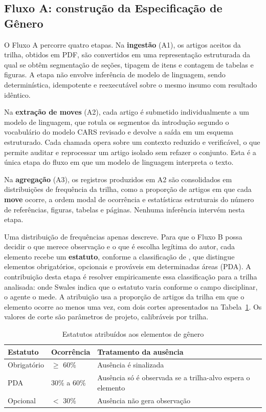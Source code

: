 \subsection{Fluxo A: construção da Especificação de Gênero}
\label{sec:fluxo-a}

O Fluxo A percorre quatro etapas. Na \textbf{ingestão} (A1), os artigos aceitos da trilha, obtidos em PDF, são convertidos em uma representação estruturada da qual se obtêm segmentação de seções, tipagem de itens e contagem de tabelas e figuras. A etapa não envolve inferência de modelo de linguagem, sendo determinística, idempotente e reexecutável sobre o mesmo insumo com resultado idêntico.

Na \textbf{extração de moves} (A2), cada artigo é submetido individualmente a um modelo de linguagem, que rotula os segmentos da introdução segundo o vocabulário do modelo CARS revisado \cite{ResearchGenres} e devolve a saída em um esquema estruturado. Cada chamada opera sobre um contexto reduzido e verificável, o que permite auditar e reprocessar um artigo isolado sem refazer o conjunto. Esta é a única etapa do fluxo em que um modelo de linguagem interpreta o texto.

Na \textbf{agregação} (A3), os registros produzidos em A2 são consolidados em distribuições de frequência da trilha, como a proporção de artigos em que cada \textbf{move} ocorre, a ordem modal de ocorrência e estatísticas estruturais do número de referências, figuras, tabelas e páginas. Nenhuma inferência intervém nesta etapa.

Uma distribuição de frequências apenas descreve. Para que o Fluxo B possa decidir o que merece observação e o que é escolha legítima do autor, cada elemento recebe um \textbf{estatuto}, conforme a classificação de , que distingue elementos obrigatórios, opcionais e prováveis em determinadas áreas (PDA). A contribuição desta etapa é resolver empiricamente essa classificação para a trilha analisada: onde Swales indica que o estatuto varia conforme o campo disciplinar, o agente o mede. A atribuição usa a proporção de artigos da trilha em que o elemento ocorre ao menos uma vez, com dois cortes apresentados na Tabela~\ref{tab:estatutos}. Os valores de corte são parâmetros de projeto, calibráveis por trilha.

\begin{table}[H]
\centering
\caption{Estatutos atribuídos aos elementos de gênero}
\label{tab:estatutos}
\small
\begin{tabular}{|p{3.2cm}|p{2.6cm}|p{7.4cm}|}
\hline
\textbf{Estatuto} & \textbf{Ocorrência} & \textbf{Tratamento da ausência} \\
\hline
Obrigatório & $\geq$ 60\% & Ausência é sinalizada \\
\hline
PDA & 30\% a 60\% & Ausência só é observada se a trilha-alvo espera o elemento \\
\hline
Opcional & $<$ 30\% & Ausência não gera observação \\
\hline
\end{tabular}
\end{table}

